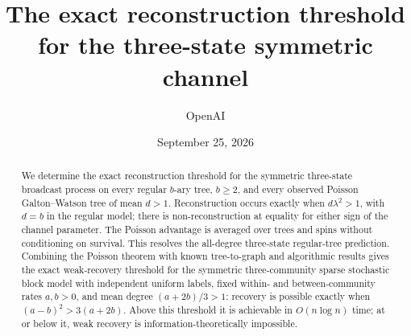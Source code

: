 \documentclass[11pt]{article}
\title{The exact reconstruction threshold\\for the three-state symmetric channel}
\author{OpenAI}
\date{September 25, 2026}
\begin{document}
\maketitle
\begin{abstract}
We determine the exact reconstruction threshold for the symmetric
three-state broadcast process on every regular $b$-ary tree, $b\ge2$,
and every observed Poisson Galton--Watson tree of mean $d>1$.
Reconstruction occurs exactly when $d\lambda^2>1$, with $d=b$ in the
regular model; there is non-reconstruction at equality for either sign
of the channel parameter. The Poisson advantage is averaged over trees
and spins without conditioning on survival. This resolves the all-degree
three-state regular-tree prediction.
Combining the Poisson theorem with known tree-to-graph and algorithmic
results gives the exact weak-recovery threshold for the symmetric
three-community sparse stochastic block model with independent uniform
labels, fixed within- and between-community rates $a,b>0$, and mean
degree $(a+2b)/3>1$: recovery is possible exactly when
$(a-b)^2>3(a+2b)$. Above this threshold it is achievable in
$O(n\log n)$ time; at or below it, weak recovery is
information-theoretically impossible.
\end{abstract}
\tableofcontents







\appendix





{}

\end{document}
